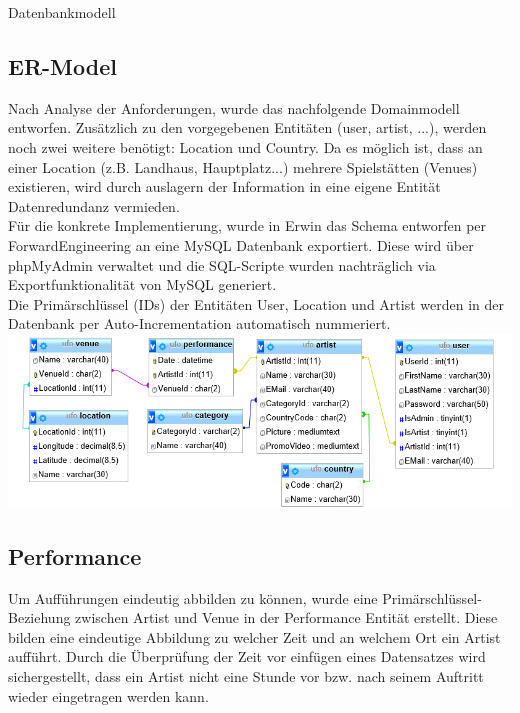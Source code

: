 \begin{section}{Datenbankmodell}

\subsection{ER-Model}
Nach Analyse der Anforderungen, wurde das nachfolgende Domainmodell entworfen.
Zusätzlich zu den vorgegebenen Entitäten (user, artist, ...), werden noch zwei weitere benötigt: Location und Country.
Da es möglich ist, dass an einer Location (z.B. Landhaus, Hauptplatz...) mehrere Spielstätten (Venues) existieren, wird durch auslagern der Information in eine eigene Entität Datenredundanz vermieden.
\\

Für die konkrete Implementierung, wurde in Erwin das Schema entworfen per ForwardEngineering an eine MySQL Datenbank exportiert. Diese wird über phpMyAdmin verwaltet und die SQL-Scripte wurden nachträglich via Exportfunktionalität von MySQL generiert.
\\

Die Primärschlüssel (IDs) der Entitäten User, Location und Artist werden in der Datenbank per Auto-Incrementation automatisch nummeriert. \\

\includegraphics[angle=0, scale=0.45]{./img/databaseEntities.jpg}
\FloatBarrier

\subsection{Performance}
Um Aufführungen eindeutig abbilden zu können, wurde eine Primärschlüssel-Beziehung zwischen Artist und Venue in der Performance Entität erstellt. Diese bilden eine eindeutige Abbildung zu welcher Zeit und an welchem Ort ein Artist aufführt. Durch die Überprüfung der Zeit vor einfügen eines Datensatzes wird sichergestellt, dass ein Artist nicht eine Stunde vor bzw. nach seinem Auftritt wieder eingetragen werden kann.


\end{section}
